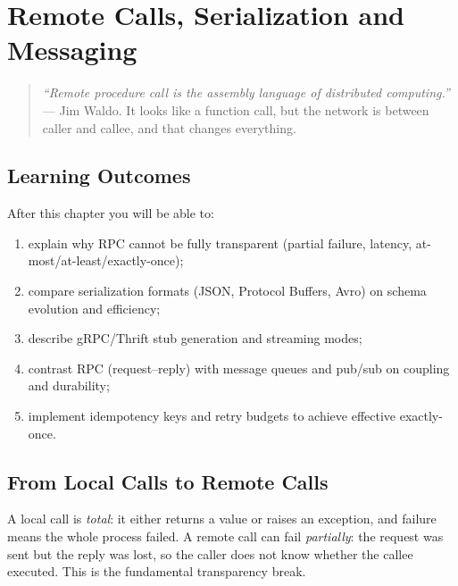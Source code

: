 \chapter{Remote Calls, Serialization and Messaging}
\label{ch:rpc}

\begin{quote}
\emph{``Remote procedure call is the assembly language of distributed computing.''} --- Jim Waldo. It looks like a function call, but the network is between caller and callee, and that changes everything.
\end{quote}

\noindent{}
\vspace{0.4em}

\section*{Learning Outcomes}
After this chapter you will be able to:
\begin{enumerate}[label=(L\arabic*)]
    \item explain why RPC cannot be fully transparent (partial failure, latency, at-most/at-least/exactly-once);
    \item compare serialization formats (JSON, Protocol Buffers, Avro) on schema evolution and efficiency;
    \item describe gRPC/Thrift stub generation and streaming modes;
    \item contrast RPC (request--reply) with message queues and pub/sub on coupling and durability;
    \item implement idempotency keys and retry budgets to achieve effective exactly-once.
\end{enumerate}

\section{From Local Calls to Remote Calls}
\label{sec:local-vs-remote}
A local call is \emph{total}: it either returns a value or raises an exception, and failure means the whole process failed. A remote call can fail \emph{partially}: the request was sent but the reply was lost, so the caller does not know whether the callee executed. This is the fundamental transparency break.

